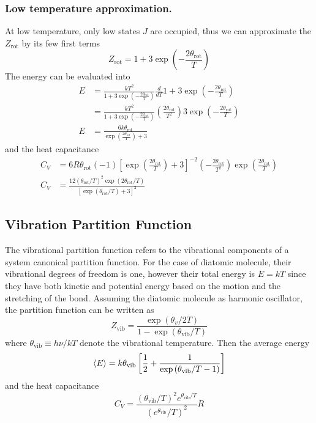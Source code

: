 \documentclass[../../../Main.tex]{subfiles}
\begin{document}
\subsubsection*{Low temperature approximation.} At low temperature, only low states $J$ are occupied, thus we can approximate the $Z_\text{rot}$ by its few first terms
\begin{equation*}
	Z_\text{rot}=1+3\exp\left(-\frac{2\theta_\text{rot}}{T}\right)
\end{equation*}
The energy can be evaluated into
\begin{align*}
	E & =\frac{kT^2}{1+3\exp\left(-\frac{2\theta_\text{rot}}{T}\right)}\frac{d}{dT}1+3\exp\left(-\frac{2\theta_\text{rot}}{T}\right)                              \\
	  & =\frac{kT^2}{1+3\exp\left(-\frac{2\theta_\text{rot}}{T}\right)}\left(\frac{2\theta_\text{rot}}{T^2}\right)3\exp\left(-\frac{2\theta_\text{rot}}{T}\right) \\
	E & =\frac{6k\theta_\text{rot}}{\exp\left(\frac{2\theta_\text{rot}}{T}\right)+3}
\end{align*}
and the heat capacitance
\begin{align*}
	C_V & =6R\theta_\text{rot}(-1)\left[\exp\left(\frac{2\theta_\text{rot}}{T}\right)+3\right]^{-2}\left(-\frac{2\theta_\text{rot}}{T^2}\right)\exp\left(\frac{2\theta_\text{rot}}{T}\right) \\
	C_V & =\frac{12(\theta_\text{rot}/T)^2\exp(2\theta_\text{rot}/T)}{\left[\exp(\theta_\text{rot}/T)+3\right]^2}
\end{align*}

\subsection*{Vibration Partition Function}
The vibrational partition function refers to the vibrational components of a system canonical partition function.
For the case of diatomic molecule, their vibrational degrees of freedom is one, however their total energy is $E=kT$ since they have both kinetic and potential energy based on the motion and the stretching of the bond.
Assuming the diatomic molecule as harmonic oscillator, the partition function can be written as
\begin{equation*}
	Z_\text{vib}=\frac{\exp\left({\theta_v}/{2T}\right)}{1-\exp\left({\theta_\text{vib}}/{T}\right)}
\end{equation*}
where $\theta_\text{vib}\equiv h\nu/kT$ denote the vibrational temperature. Then the average energy
\begin{equation*}
	\braket{E}=k\theta_\text{vib}\left[\frac{1}{2}+\frac{1}{\exp\left(\theta_\text{vib}/T-1\right)}\right]
\end{equation*}
and the heat capacitance
\begin{equation*}
	C_V=\frac{(\theta_\text{vib}/T)^2e^{\theta_\text{vib}/T}}{(e^{\theta_\text{vib}}/T)^2}R
\end{equation*}
\end{document}
